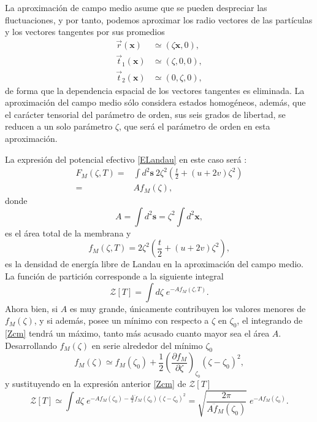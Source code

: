 La aproximación de campo medio asume que se pueden despreciar las
fluctuaciones, y por tanto, podemos aproximar los radio vectores de las
partículas y los vectores tangentes por sus promedios
\begin{align*}
 \vec{r}(\mathbf{x})&\simeq(\zeta \mathbf{x},0),\\
 \vec{t}_1(\mathbf{x})&\simeq(\zeta ,0,0),\\
 \vec{t}_2(\mathbf{x})&\simeq(0,\zeta,0),
\end{align*}
de forma que la dependencia espacial de los vectores tangentes es eliminada. La
aproximación del campo medio sólo considera estados homogéneos, además, que
el carácter tensorial del parámetro de orden, sus seis grados de libertad, se
reducen a un solo parámetro $\zeta$, que será el parámetro de orden en esta
aproximación.

La expresión del potencial efectivo \eqref{ELandau} en este caso será \cite{Bowick:Libro_superficies}:
\begin{align}
  F_M(\zeta,T)=&\int\! d^2 \mathbf{s}\ 2\zeta^2\!\left( \frac{t}{2} + (u+2v)\zeta^2\right)\\
  =&Af_M(\zeta),
\end{align}
donde 
$$A=\int d^2 \mathbf{s}=\zeta^2\int d^2 \mathbf{x} ,$$
es el área total de la membrana y 
\begin{equation}\label{densidadELandau}
f_M(\zeta,T)=2\zeta^2\!\left( \frac{t}{2} + (u+2v)\zeta^2\right),
\end{equation}
es la densidad de energía libre de Landau en la aproximación del campo medio. 
La función de partición corresponde a la siguiente integral
\begin{equation}\label{Zcm}
 \mathcal{Z}[T]=\int d\zeta\;e^{-Af_M(\zeta,T)}.
\end{equation}
Ahora bien, si $A$ es muy grande, únicamente contribuyen los valores menores de
$f_M(\zeta)$, y si además, posee un mínimo con respecto a $\zeta$ en
$\zeta_0$, el integrando de \eqref{Zcm} tendrá un máximo,
tanto más acusado cuanto mayor sea el área $A$. Desarrollando $f_M(\zeta)$ en
serie alrededor del mínimo $\zeta_0$
\begin{equation*}
f_M(\zeta)\simeq f_M(\zeta_0)+\frac{1}{2}\left(\frac{\partial f_M}{\partial \zeta}\right)_{\!\zeta_0}(\zeta-\zeta_0)^2,
\end{equation*}
y sustituyendo en la expresión anterior \eqref{Zcm} de $\mathcal{Z}[T]$ 
\begin{equation}\label{Zcm2}
 \mathcal{Z}[T]\simeq\int
 d\zeta\;e^{-Af_M(\zeta_0)-\frac{A}{2}\ddot{f}_M(\zeta_0)(\zeta-\zeta_0)^2}=
 \sqrt{\frac{2\pi}{A\ddot{f}_M(\zeta_0)}}\; e^{-Af_M(\zeta_0)}.
\end{equation}

